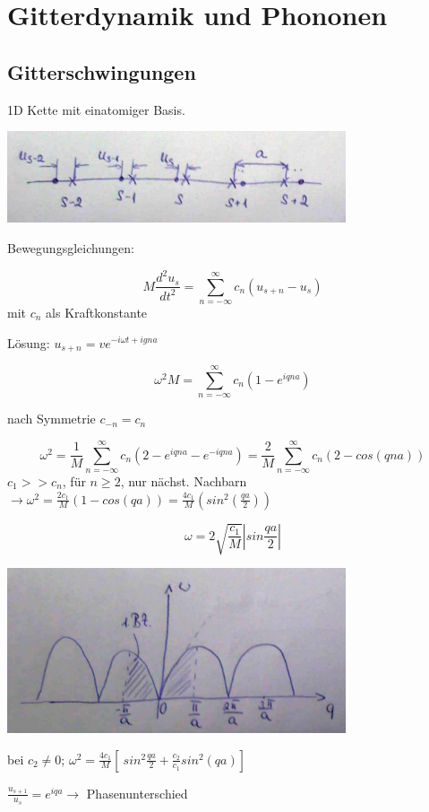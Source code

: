 \chapter{Gitterdynamik und Phononen}

\section{Gitterschwingungen}

1D Kette mit einatomiger Basis. 

\includegraphics[width=0.75\textwidth]{kap06_01.png}

Bewegungsgleichungen:

\[ M\frac{d^2 u_s}{dt^2} = \sum^{\infty}_{n=-\infty}c_n(u_{s+n}-u_s)\]
mit \(c_n\) als Kraftkonstante

Lösung: \(u_{s+n}=v e^{-i\omega t + igna}\)

\[\omega^2 M = \sum^{\infty}_{n=-\infty}c_n(1-e^{iqna})\]

nach Symmetrie \(c_{-n}=c_n\)

\[\omega^2 = \frac{1}{M} \sum^{\infty}_{n=-\infty}c_n(2-e^{iqna}-e^{-iqna})=\frac{2}{M} \sum^{\infty}_{n=-\infty}c_n(2-cos(qna))\]
\(c_1 >> c_n\), für  \(n\geq 2\), nur nächst. Nachbarn \(\rightarrow \omega^2=\frac{2c_1}{M} (1-cos(qa)) =\frac{4c_1}{M} (sin^2(\frac{qa}{2}))\)

\[\omega = 2\sqrt{\frac{c_1}{M}}\left| sin\frac{qa}{2}\right|\]

\includegraphics[width=0.75\textwidth]{kap06_02.png}

bei \(c_2\neq 0\); \(\omega^2 = \frac{4c_1}{M}\left[\ sin^2\frac{qa}{2} + \frac{c_2}{c_1}sin^2(qa) \right]\)

\(\frac{u_{s+1}}{u_s} = e^{iqa}\rightarrow\) Phasenunterschied

